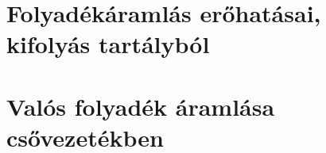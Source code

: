 \documentclass[11pt, a4paper]{report}
\begin{document}























\chapter{Folyadékáramlás erőhatásai, kifolyás tartályból}





























\chapter{Valós folyadék áramlása csővezetékben}



\end{document}
